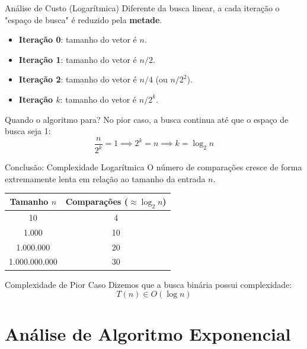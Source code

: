 \documentclass[9pt]{beamer}
\begin{document}
\begin{frame}{Análise de Custo (Logarítmica)}
    Diferente da busca linear, a cada iteração o "espaço de busca" é reduzido pela \textbf{metade}.
    \vspace{0.3cm}
    \begin{itemize}
        \item \textbf{Iteração 0}: tamanho do vetor é $n$.
        \item \textbf{Iteração 1}: tamanho do vetor é $n/2$.
        \item \textbf{Iteração 2}: tamanho do vetor é $n/4$ (ou $n/2^2$).
        \item \textbf{Iteração $k$}: tamanho do vetor é $n/2^k$.
    \end{itemize}
    \vspace{0.3cm}
    \begin{block}{Quando o algoritmo para?}
        No pior caso, a busca continua até que o espaço de busca seja 1:
        \[ \frac{n}{2^k} = 1 \implies 2^k = n \implies k = \log_2 n \]
    \end{block}
\end{frame}

\begin{frame}{Conclusão: Complexidade Logarítmica}
    O número de comparações cresce de forma extremamente lenta em relação ao tamanho da entrada $n$.
    \vspace{0.4cm}
    \begin{table}
        \centering
        \small
        \begin{tabular}{c|c}
            \hline
            \textbf{Tamanho $n$} & \textbf{Comparações ($\approx \log_2 n$)} \\
            \hline
            10 & 4 \\
            1.000 & 10 \\
            1.000.000 & 20 \\
            1.000.000.000 & 30 \\
            \hline
        \end{tabular}
    \end{table}
    \vspace{0.4cm}
    \begin{alertblock}{Complexidade de Pior Caso}
        Dizemos que a busca binária possui complexidade:
        \[ T(n) \in O(\log n) \]
    \end{alertblock}
\end{frame}

\section{Análise de Algoritmo Exponencial}
\end{document}

